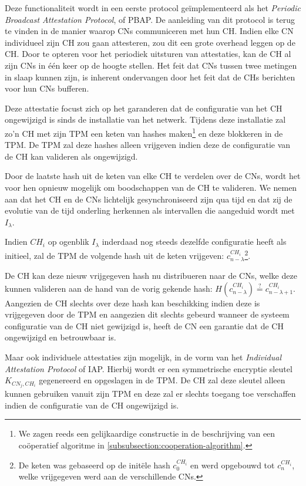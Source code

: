 Deze functionaliteit wordt in een eerste protocol ge\"implementeerd als het
\emph{Periodic Broadcast Attestation Protocol}, of PBAP. De aanleiding van dit
protocol is terug te vinden in de manier waarop CNs communiceren met hun CH.
Indien elke CN individueel zijn CH zou gaan attesteren, zou dit een grote
overhead leggen op de CH. Door te opteren voor het periodiek uitsturen van
attestaties, kan de CH al zijn CNs in \'e\'en keer op de hoogte stellen. Het
feit dat CNs tussen twee metingen in slaap kunnen zijn, is inherent ondervangen
door het feit dat de CHs berichten voor hun CNs bufferen.

Deze attestatie focust zich op het garanderen dat de configuratie van het CH
ongewijzigd is sinds de installatie van het netwerk. Tijdens deze installatie
zal zo'n CH met zijn TPM een keten van hashes maken\footnote{We zagen reeds een
gelijkaardige constructie in de beschrijving van een co\"operatief algoritme in
\ref{subsubsection:cooperation-algorithm}.} en deze blokkeren in de TPM. De TPM
zal deze hashes alleen vrijgeven indien deze de configuratie van de CH kan
valideren als ongewijzigd.

Door de laatste hash uit de keten van elke CH te verdelen over de CNs, wordt
het voor hen opnieuw mogelijk om boodschappen van de CH te valideren. We nemen
aan dat het CH en de CNs lichtelijk gesynchroniseerd zijn qua tijd en dat zij
de evolutie van de tijd onderling herkennen als intervallen die aangeduid wordt
met $I_\lambda$.

Indien $CH_i$ op ogenblik $I_\lambda$ inderdaad nog steeds dezelfde
configuratie heeft als initieel, zal de TPM de volgende hash uit de keten
vrijgeven: $c_{n-\lambda}^{CH_i}$\footnote{De keten was gebaseerd op de
init\"ele hash $c_0^{CH_i}$ en werd opgebouwd tot $c_n^{CH_i}$, welke
vrijgegeven werd aan de verschillende CNs.}.

De CH kan deze nieuw vrijgegeven hash nu distribueren naar de CNs, welke deze
kunnen valideren aan de hand van de vorig gekende hash:
$H(c_{n-\lambda}^{CH_i}) \overset{?}{=} c_{n-\lambda+1}^{CH_i}$. Aangezien de
CH slechts over deze hash kan beschikking indien deze is vrijgegeven door de
TPM en aangezien dit slechts gebeurd wanneer de systeem configuratie van de CH
niet gewijzigd is, heeft de CN een garantie dat de CH ongewijzigd en
betrouwbaar is.

Maar ook individuele attestaties zijn mogelijk, in de vorm van het
\emph{Individual Attestation Protocol} of IAP. Hierbij wordt er een
symmetrische encryptie sleutel $K_{CN_j,CH_i}$ gegenereerd en opgeslagen in de
TPM. De CH zal deze sleutel alleen kunnen gebruiken vanuit zijn TPM en deze zal
er slechts toegang toe verschaffen indien de configuratie van de CH ongewijzigd
is.

